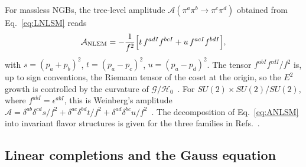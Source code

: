 \documentclass[aps,prd,twocolumn,superscriptaddress,nofootinbib,floatfix]{revtex4-2}
\theoremstyle{remark}
\newcommand{\G}{\mathcal{G}}
\newcommand{\Hg}{\mathcal{H}_0}    %
\begin{document}
For massless NGBs, the tree-level amplitude $\mathcal{A}(\pi^a\pi^b\to\pi^c\pi^d)$ obtained from Eq.~\eqref{eq:LNLSM} reads
\begin{equation}
\mathcal{A}_{\rm NL\Sigma M}=-\frac{1}{f^2}\Big[t\,f^{adI}f^{bcI}+u\,f^{acI}f^{bdI}\Big],
\label{eq:ANLSM}
\end{equation}
with $s=(p_a+p_b)^2$, $t=(p_a-p_c)^2$, $u=(p_a-p_d)^2$. The tensor $f^{abI}f^{cdI}/f^2$ is, up to sign conventions, the Riemann tensor of the coset at the origin, so the $E^2$ growth is controlled by the curvature of $\G/\Hg$~\cite{Alonso:2016oah,Cohen:2021ucp}. For $SU(2)\times SU(2)/SU(2)$, where $f^{abI}=\epsilon^{abI}$, this is Weinberg's amplitude $\mathcal{A}=\delta^{ab}\delta^{cd}s/f^2+\delta^{ac}\delta^{bd}t/f^2+\delta^{ad}\delta^{bc}u/f^2$~\cite{Weinberg:1966kf}. The decomposition of Eq.~\eqref{eq:ANLSM} into invariant flavor structures is given for the three families in Refs.~\cite{Chivukula:1992gi,Bijnens:2011fm}.

\subsection{Linear completions and the Gauss equation}
\label{sec:Gauss}
\end{document}

